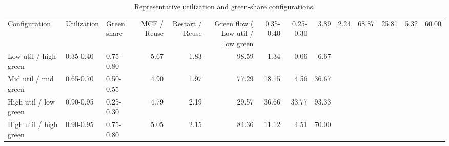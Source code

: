 \begin{table}
\caption{Representative utilization and green-share configurations.}
\label{tab:representative-configurations}
\begin{tabular}{lllrrrrrr}
\toprule
Configuration & Utilization & Green share & MCF / Reuse & Restart / Reuse & Green flow (%
\midrule
Low util / low green & 0.35-0.40 & 0.25-0.30 & 3.89 & 2.24 & 68.87 & 25.81 & 5.32 & 60.00 \\
Low util / high green & 0.35-0.40 & 0.75-0.80 & 5.67 & 1.83 & 98.59 & 1.34 & 0.06 & 6.67 \\
Mid util / mid green & 0.65-0.70 & 0.50-0.55 & 4.90 & 1.97 & 77.29 & 18.15 & 4.56 & 36.67 \\
High util / low green & 0.90-0.95 & 0.25-0.30 & 4.79 & 2.19 & 29.57 & 36.66 & 33.77 & 93.33 \\
High util / high green & 0.90-0.95 & 0.75-0.80 & 5.05 & 2.15 & 84.36 & 11.12 & 4.51 & 70.00 \\
\bottomrule
\end{tabular}
\end{table}
